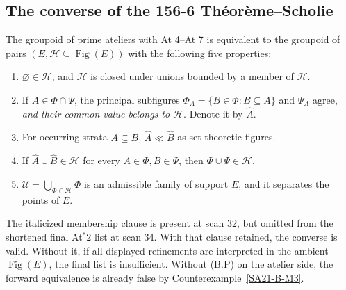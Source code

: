\subsection{The converse of the 156-6 Th\'eor\`eme--Scholie}

\begin{theorem}
\label{SA21-B-Atstar}
The groupoid of prime ateliers with At 4--At 7 is equivalent to the
groupoid of pairs \((E,\mathscr H\subseteq\operatorname{Fig}(E))\)
with the following five properties:
\begin{enumerate}
\item \(\varnothing\in\mathscr H\), and \(\mathscr H\) is closed
under unions bounded by a member of \(\mathscr H\).
\item If \(A\in\Phi\cap\Psi\), the principal subfigures
\(\Phi_A=\{B\in\Phi:B\subseteq A\}\) and \(\Psi_A\) agree,
\emph{and their common value belongs to \(\mathscr H\)}.
Denote it by \(\widehat A\).
\item For occurring strata \(A\subseteq B\),
\(\widehat A\ll\widehat B\) as set-theoretic figures.
\item If \(\widehat A\cup\widehat B\in\mathscr H\) for every
\(A\in\Phi,B\in\Psi\), then \(\Phi\cup\Psi\in\mathscr H\).
\item \(\mathscr U=\bigcup_{\Phi\in\mathscr H}\Phi\) is an
admissible family of support \(E\), and it separates the points of \(E\).
\end{enumerate}
The italicized membership clause is present at scan 32, but omitted
from the shortened final At\(^*2\) list at scan 34. With that clause
retained, the converse is valid. Without it, if all displayed
refinements are interpreted in the ambient \(\operatorname{Fig}(E)\),
the final list is insufficient. Without (B.P) on the atelier side,
the forward equivalence is already false by
Counterexample~\ref{SA21-B-M3}.
\end{theorem}

